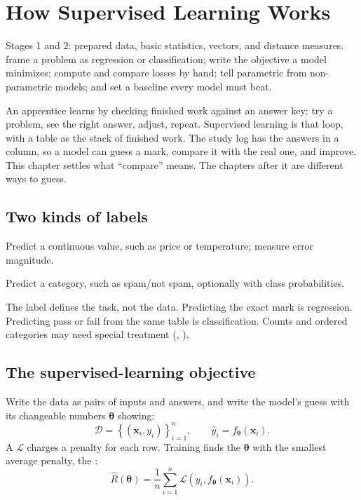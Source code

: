 \chapter{How Supervised Learning Works}
\label{ch:supervised}

\chapterguide%
  {Stages 1 and 2: prepared data, basic statistics, vectors, and distance measures.}
  {frame a problem as regression or classification; write the objective a model minimizes; compute and compare losses by hand; tell parametric from non-parametric models; and set a baseline every model must beat.}

An apprentice learns by checking finished work against an answer key: try a problem, see the right answer, adjust, repeat. Supervised learning is that loop, with a table as the stack of finished work. The study log has the answers in a column, so a model can guess a mark, compare it with the real one, and improve. This chapter settles what ``compare'' means. The chapters after it are different ways to guess.

\section{Two kinds of labels}

\begin{description}[leftmargin=1.25in,style=nextline]
  \item[Regression] Predict a continuous value, such as price or temperature; measure error magnitude.
  \item[Classification] Predict a category, such as spam/not spam, optionally with class probabilities.
\end{description}

The label defines the task, not the data. Predicting the exact mark is regression. Predicting pass or fail from the same table is classification. Counts and ordered categories may need special treatment (, ).

\section{The supervised-learning objective}

Write the data as pairs of inputs and answers, and write the model's guess with its changeable numbers $\bm{\theta}$ showing:
\[
  \mathcal{D}={\left\{(\bm{x}_i,y_i)\right\}}_{i=1}^{n},
  \qquad
  \hat{y}_i=f_{\bm{\theta}}(\bm{x}_i).
\]
A  $\mathcal{L}$ charges a penalty for each row. Training finds the $\bm{\theta}$ with the smallest average penalty, the :
\[
  \hat{R}(\bm{\theta})
  =\frac{1}{n}\sum_{i=1}^{n}
  \mathcal{L}\!\left(y_i,f_{\bm{\theta}}(\bm{x}_i)\right).
\]

